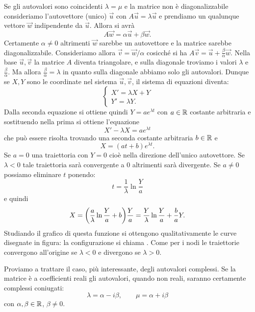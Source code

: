 Se gli autovalori sono coincidenti $\lambda = \mu$ e la matrice
non è diagonalizzabile consideriamo l'autovettore (unico)
$\vec u$ con $A \vec u = \lambda \vec u$
e prendiamo un qualunque vettore $\vec w$
indipendente da $\vec u$. Allora si avrà
\[
  A \vec w = \alpha \vec u + \beta \vec w.
\]
Certamente $\alpha \neq 0$ altrimenti $\vec w$
sarebbe un autovettore e la matrice sarebbe diagonalizzabile.
Consideriamo allora $\vec v = \vec w / \alpha$
cosicché si ha $A \vec v = \vec u + \frac{\beta}{\alpha} \vec w$.
Nella base $\vec u, \vec v$ la matrice $A$ diventa
triangolare, e sulla diagonale troviamo i valori $\lambda$
e $\frac{\beta}{\alpha}$.
Ma allora $\frac{\beta}{\alpha} = \lambda$ in quanto sulla diagonale
abbiamo solo gli autovalori. Dunque se $X,Y$ sono le coordinate nel
sistema $\vec u, \vec v$, il sistema di equazioni diventa:
\[
\begin{cases}
X' = \lambda X + Y \\
Y' = \lambda Y.
\end{cases}
\]
Dalla seconda equazione si ottiene quindi $Y = a e^{\lambda t}$
con $a\in \mathbb R$ costante arbitraria
e sostituendo nella prima si ottiene l'equazione
\[
  X' - \lambda X = a e^{\lambda t}
\]
che può essere risolta trovando una seconda costante arbitraria $b\in \mathbb R$ e
\[
  X = (at+b) e^{\lambda t}.
\]
Se $a=0$ una traiettoria con $Y=0$ cioè nella direzione dell'unico autovettore.
Se $\lambda <0$ tale traiettoria sarà convergente a $0$ altrimenti sarà divergente.
Se $a\neq 0$ possiamo eliminare $t$ ponendo:
\[
  t = \frac 1 \lambda \ln \frac{Y}{a}
\]
e quindi
\[
  X = {\left( \frac{a}{\lambda} \ln \frac{Y}{a}+ b \right)} \frac{Y}{a}
  =  \frac{Y}{\lambda}\ln \frac{Y}{a}+ \frac{b}{a}Y.
\]
Studiando il grafico di questa funzione si ottengono qualitativamente
le curve disegnate in figura: la configurazione si chiama .
Come per i nodi le traiettorie convergono all'origine se $\lambda < 0$ e
divergono se $\lambda >0$.

Proviamo a trattare il caso, più interessante,
degli autovalori complessi. Se la matrice è a coefficienti
reali gli autovalori, quando
non reali, saranno certamente complessi coniugati:
\[
  \lambda = \alpha - i \beta,
  \qquad
  \mu = \alpha + i \beta
\]
con $\alpha,\beta\in \mathbb R$, $\beta\neq 0$.

